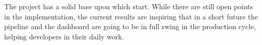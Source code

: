 \documentclass[../main.tex]{subfiles}
\begin{document}
The project has a solid base upon which start. While there are still open points in the implementation, the current results are inspiring that in a short future the pipeline and the dashboard are going to be in full swing in the production cycle, helping developers in their daily work. 
\cleardoublepage
\end{document}
